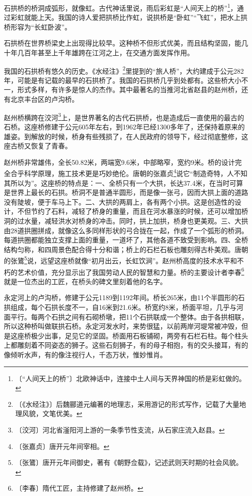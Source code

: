 \documentclass[12pt,UTF-8,openany]{ctexbook}
\begin{document}
\begin{large}
    
    石拱桥的桥洞成弧形，就像虹。古代神话里说，雨后彩虹是“人间天上的桥”\footnote{〔“人间天上的桥”〕北欧神话中，连接中土人间与天界神国的桥是彩虹做的。}，通过彩虹就能上天。我国的诗人爱把拱桥比作虹，说拱桥是“卧虹”“飞虹”，把水上拱桥形容为“长虹卧波”。
    
    石拱桥在世界桥梁史上出现得比较早。这种桥不但形式优美，而且结构坚固，能几十年几百年甚至上千年雄跨在江河之上，在交通方面发挥作用。
    
    我国的石拱桥有悠久的历史。《水经注》\footnote{〔《水经注》〕后魏郦道元编著的地理志，采用游记的形式写作，记载了大量地理风貌，文笔优美。}里提到的“旅人桥”，大约建成于公元282年，可能是有记载的最早的石拱桥了。我国的石拱桥几乎到处都有。这些桥大小不一，形式多样，有许多是惊人的杰作。其中最著名的当推河北省赵县的赵州桥，还有北京丰台区的卢沟桥。
    
    赵州桥横跨在洨河\footnote{〔洨河〕河北省滏阳河上游的一条季节性支流，从石家庄流入赵县。}上，是世界著名的古代石拱桥，也是造成后一直使用的最古的石桥。这座桥修建于公元605年左右，到1962年已经1300多年了，还保持着原来的雄姿。到解放的时候，桥身有些残损了，在人民政府的领导下，经过彻底整修，这座古桥又恢复了青春。
    
    赵州桥非常雄伟，全长50.82米，两端宽9.6米，中部略窄，宽约9米。桥的设计完全合乎科学原理，施工技术更是巧妙绝伦。唐朝的张嘉贞\footnote{〔张嘉贞〕唐开元年间宰相。}说它“制造奇特，人不知其所以为”。这座桥的特点是：一、全桥只有一个大拱，长达37.4米，在当时可算是世界上最长的石拱。桥洞不是普通半圆形，而是像一张弓，因而大拱上面的道路没有陡坡，便于车马上下。二、大拱的两肩上，各有两个小拱。这是创造性的设计，不但节约了石料，减轻了桥身的重量，而且在河水暴涨的时候，还可以增加桥洞的过水量，减轻洪水对桥身的冲击。同时，拱上加拱，桥身也更美观。三、大拱由28道拱圈拼成，就像这么多同样形状的弓合拢在一起，作成了一个弧形的桥洞。每道拱圈都能独立支撑上面的重量，一道坏了，其他各道不致受到影响。四、全桥结构匀称，和四周景色配合得十分和谐；桥上的石栏石板也雕刻得古朴美观。唐朝的张鷟\footnote{〔张鷟〕唐开元年间御史，著有《朝野佥载》，记述武则天时期的社会风貌。}说，远望这座桥就像“初月出云，长虹饮涧”。赵州桥高度的技术水平和不朽的艺术价值，充分显示出了我国劳动人民的智慧和力量。桥的主要设计者李春\footnote{〔李春〕隋代工匠，主持修建了赵州桥。}就是一位杰出的工匠，在桥头的碑文里刻着他的名字。
    
    永定河上的卢沟桥，修建于公元1189到1192年间。桥长265米，由11个半圆形的石拱组成，每个石拱长度不一，自16米到21.6米。桥宽约8米，桥面平坦，几乎与河面平行。每两个石拱之间有石砌桥墩，把11个石拱联成一个整体。由于各拱相联，所以这种桥叫做联拱石桥。永定河发水时，来势很猛，以前两岸河堤常被冲毁，但是这座桥极少出事，足见它的坚固。桥面用石板铺砌，两旁有石栏石柱。每个柱头上都雕刻着不同姿态的狮子。这些石刻狮子，有的母子相抱，有的交头接耳，有的像倾听水声，有的像注视行人，千态万状，惟妙惟肖。
    

\end{large}
\end{document}
